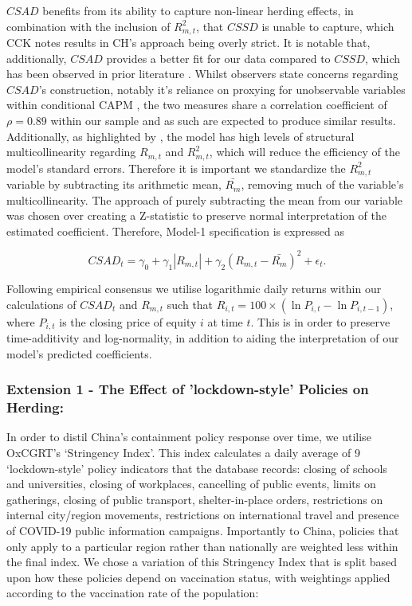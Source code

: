 \documentclass[12pt]{article}
\numberwithin{table}{section}   %
\begin{document}
$CSAD$ benefits from its ability to capture non-linear herding effects, in combination with the inclusion of $R_{m,t}^2$, that $CSSD$ is unable to capture, which CCK notes results in CH’s approach being overly strict. It is notable that, additionally, $CSAD$ provides a better fit for our data compared to $CSSD$, which has been observed in prior literature \citep{gleason}. Whilst observers state concerns regarding $CSAD$’s construction, notably it’s reliance on proxying for unobservable variables within conditional CAPM \citep{yao, tan}, the two measures share a correlation coefficient of $\rho=0.89$ within our sample and as such are expected to produce similar results. Additionally, as highlighted by \citet{yao}, the model has high levels of structural multicollinearity regarding $R_{m,t}$ and $R_{m,t}^2$, which will reduce the efficiency of the model's standard errors. Therefore it is important we standardize the $R_{m,t}^2$ variable by subtracting its arithmetic mean, $\bar{R_m}$, removing much of the variable's multicollinearity. The approach of purely subtracting the mean from our variable was chosen over creating a Z-statistic to preserve normal interpretation of the estimated coefficient. Therefore, Model-1 specification is expressed as

\begin{equation}\label{model-1}
    CSAD_t=\gamma_0+\gamma_1 |R_{m,t}|+\gamma_2 (R_{m,t}-\bar{R_m})^2+\epsilon_t.
\end{equation}

Following empirical consensus \citep{yao, tan, chiang} we utilise logarithmic daily returns within our calculations of $CSAD_t$ and $R_{m,t}$ such that $R_{i,t}=100\times(\ln{P_{i,t}}-\ln{P_{i,t-1}})$, where $P_{i,t}$ is the closing price of equity $i$ at time $t$. This is in order to preserve time-additivity and log-normality, in addition to aiding the interpretation of our model’s predicted coefficients.

\subsubsection*{Extension 1 - The Effect of 'lockdown-style' Policies on Herding:}

In order to distil China’s containment policy response over time, we utilise OxCGRT’s ‘Stringency Index’. This index calculates a daily average of 9 ‘lockdown-style’ policy indicators that the database records: closing of schools and universities, closing of workplaces, cancelling of public events, limits on gatherings, closing of public transport, shelter-in-place orders, restrictions on internal city/region movements, restrictions on international travel and presence of COVID-19 public information campaigns. Importantly to China, policies that only apply to a particular region rather than nationally are weighted less within the final index. We chose a variation of this Stringency Index that is split based upon how these policies depend on vaccination status, with weightings applied according to the vaccination rate of the population:
\end{document}
